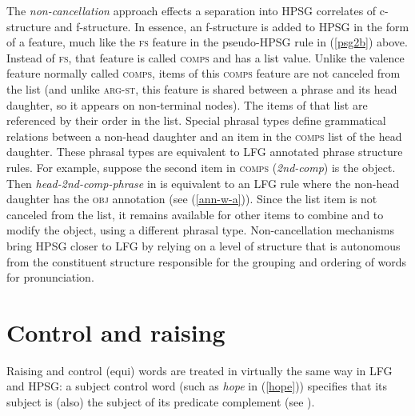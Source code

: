 The \textit{non-cancellation}  approach  effects a separation into HPSG correlates of c-structure and f-structure.  In essence, an f-structure is added to HPSG in the form of a feature, much like the \textsc{fs} feature in the pseudo-HPSG rule in (\ref{psg2b}) above.  Instead of \textsc{fs}, that feature is called \textsc{comps} and has a list value.  Unlike the valence feature normally called \textsc{comps}, items of this \textsc{comps} feature are not canceled from the list (and unlike \textsc{arg-st}, this feature is shared between a phrase and its head daughter, so it appears on non-terminal nodes).  The items of that list are referenced by their order in the list.  Special phrasal types define grammatical relations between a non-head daughter and an item in the \textsc{comps} list of the head daughter.  These phrasal types are equivalent to LFG annotated phrase structure rules.  For example, suppose the second item in \textsc{comps} (\textit{2nd-comp}) is the object.  Then \textit{head-2nd-comp-phrase} in \citet[12]{Bender2008a} is equivalent to an LFG rule where the non-head daughter has the \textsc{obj} annotation (see (\ref{ann-w-a})).  Since the list item is not canceled from the list, it remains available for other items to combine and to modify the object, using a different phrasal type.  Non-cancellation mechanisms bring HPSG closer to LFG by relying on a level of structure that is autonomous from the constituent structure  responsible for the grouping and ordering of words for pronunciation.  


\section{Control and raising}

Raising and control (equi) words are treated in virtually the same way in LFG and HPSG: a subject control word (such as \textit{hope} in (\ref{hope})) specifies that its subject is (also) the subject of its predicate complement (see ).  

